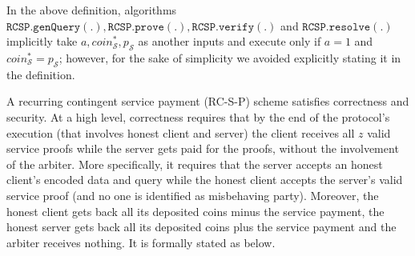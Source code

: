 In the above definition, algorithms $\mathtt{RCSP}.\mathtt{genQuery}(.),\mathtt{RCSP}.\mathtt{prove}(.),\mathtt{RCSP}.\mathtt{verify}(.)$ and $\mathtt{RCSP}.\mathtt{resolve}(.)$ implicitly  take $a, coin^{\scriptscriptstyle*}_{\scriptscriptstyle\mathcal{S}}, p_{\scriptscriptstyle\mathcal{S}}$ as another inputs and  execute only if $a=1$ and $coin^{\scriptscriptstyle*}_{\scriptscriptstyle\mathcal{S}}=p_{\scriptscriptstyle\mathcal{S}}$; however, for the sake of simplicity we  avoided explicitly stating it  in the definition. 

A recurring contingent service payment (RC-S-P)  scheme satisfies correctness and security. At a high level, correctness requires that by the end of the protocol's execution  (that involves  honest client and server) the client receives all $z$ valid service proofs while the server gets paid  for the proofs, without the involvement of the arbiter. More specifically, it requires that the server accepts an honest client's encoded data and query while the honest client accepts the server's valid service proof (and no one is identified as misbehaving party). Moreover, the honest client gets back all its deposited coins minus the service payment, the honest server gets back all its deposited coins  plus the service payment and the arbiter receives nothing. It is formally stated as below.



